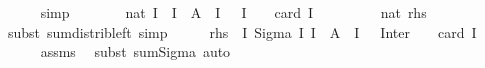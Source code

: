 \begin{isabellebody}
\ \ \ \ \isamarkupfalse%
\ simp\isanewline
\ \ \isamarkupfalse%
\ \isamarkupfalse%
\ {\isachardoublequoteopen}{\isasymdots}\ {\isacharequal}{\kern0pt}\ nat\ {\isacharparenleft}{\kern0pt}{\isasymSum}I\ {\isacharbar}{\kern0pt}\ I\ {\isasymsubseteq}\ A\ {\isasymand}\ I\ {\isasymnoteq}\ {\isacharbraceleft}{\kern0pt}{\isacharbraceright}{\kern0pt}{\isachardot}{\kern0pt}\ {\isacharparenleft}{\kern0pt}{\isasymSum}{\isacharunderscore}{\kern0pt}{\isasymin}{\isasymInter}I{\isachardot}{\kern0pt}\ {\isacharparenleft}{\kern0pt}{\isacharminus}{\kern0pt}\ {}{\isacharparenright}{\kern0pt}\ {\isacharcircum}{\kern0pt}\ {\isacharparenleft}{\kern0pt}card\ I\ {\isacharplus}{\kern0pt}\ {}{\isacharparenright}{\kern0pt}{\isacharparenright}{\kern0pt}{\isacharparenright}{\kern0pt}{\isachardoublequoteclose}\isanewline
\ \ \ \ {\isacharparenleft}{\kern0pt}\ {\isachardoublequoteopen}{\isacharunderscore}{\kern0pt}\ {\isacharequal}{\kern0pt}\ nat\ {\isacharquery}{\kern0pt}rhs{\isachardoublequoteclose}{\isacharparenright}{\kern0pt}\isanewline
\ \ \ \ \isamarkupfalse%
\ {\isacharparenleft}{\kern0pt}subst\ sum{\isacharunderscore}{\kern0pt}distrib{\isacharunderscore}{\kern0pt}left{\isacharparenright}{\kern0pt}\ simp\isanewline
\ \ \isamarkupfalse%
\ \isamarkupfalse%
\ {\isachardoublequoteopen}{\isacharquery}{\kern0pt}rhs\ {\isacharequal}{\kern0pt}\ {\isacharparenleft}{\kern0pt}{\isasymSum}{\isacharparenleft}{\kern0pt}I{\isacharcomma}{\kern0pt}\ {\isacharunderscore}{\kern0pt}{\isacharparenright}{\kern0pt}{\isasymin}Sigma\ {\isacharbraceleft}{\kern0pt}I{\isachardot}{\kern0pt}\ I\ {\isasymsubseteq}\ A\ {\isasymand}\ I\ {\isasymnoteq}\ {\isacharbraceleft}{\kern0pt}{\isacharbraceright}{\kern0pt}{\isacharbraceright}{\kern0pt}\ Inter{\isachardot}{\kern0pt}\ {\isacharparenleft}{\kern0pt}{\isacharminus}{\kern0pt}\ {}{\isacharparenright}{\kern0pt}\ {\isacharcircum}{\kern0pt}\ {\isacharparenleft}{\kern0pt}card\ I\ {\isacharplus}{\kern0pt}\ {}{\isacharparenright}{\kern0pt}{\isacharparenright}{\kern0pt}{\isachardoublequoteclose}\isanewline
\ \ \ \ \isamarkupfalse%
\ assms\ \isamarkupfalse%
\ {\isacharparenleft}{\kern0pt}subst\ sum{\isachardot}{\kern0pt}Sigma{\isacharparenright}{\kern0pt}\ auto\isanewline
\ \ \isamarkupfalse%
\ \isamarkupfalse%

\end{isabellebody}
